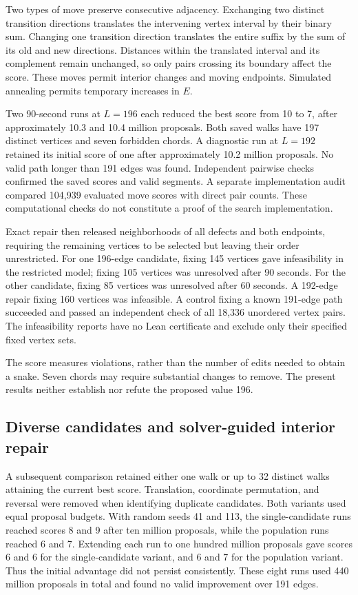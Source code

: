 \documentclass[11pt,a4paper]{article}
\theoremstyle{definition}
\theoremstyle{remark}
\begin{document}
Two types of move preserve consecutive adjacency. Exchanging two distinct transition directions translates the intervening vertex interval by their binary sum. Changing one transition direction translates the entire suffix by the sum of its old and new directions. Distances within the translated interval and its complement remain unchanged, so only pairs crossing its boundary affect the score. These moves permit interior changes and moving endpoints. Simulated annealing permits temporary increases in $E$.

Two 90-second runs at $L=196$ each reduced the best score from 10 to 7, after approximately 10.3 and 10.4 million proposals. Both saved walks have 197 distinct vertices and seven forbidden chords. A diagnostic run at $L=192$ retained its initial score of one after approximately 10.2 million proposals. No valid path longer than 191 edges was found. Independent pairwise checks confirmed the saved scores and valid segments. A separate implementation audit compared 104,939 evaluated move scores with direct pair counts. These computational checks do not constitute a proof of the search implementation.

Exact repair then released neighborhoods of all defects and both endpoints, requiring the remaining vertices to be selected but leaving their order unrestricted. For one 196-edge candidate, fixing 145 vertices gave infeasibility in the restricted model; fixing 105 vertices was unresolved after 90 seconds. For the other candidate, fixing 85 vertices was unresolved after 60 seconds. A 192-edge repair fixing 160 vertices was infeasible. A control fixing a known 191-edge path succeeded and passed an independent check of all 18,336 unordered vertex pairs. The infeasibility reports have no Lean certificate and exclude only their specified fixed vertex sets.

The score measures violations, rather than the number of edits needed to obtain a snake. Seven chords may require substantial changes to remove. The present results neither establish nor refute the proposed value 196.

\subsection{Diverse candidates and solver-guided interior repair}
A subsequent comparison retained either one walk or up to 32 distinct walks attaining the current best score. Translation, coordinate permutation, and reversal were removed when identifying duplicate candidates. Both variants used equal proposal budgets. With random seeds 41 and 113, the single-candidate runs reached scores 8 and 9 after ten million proposals, while the population runs reached 6 and 7. Extending each run to one hundred million proposals gave scores 6 and 6 for the single-candidate variant, and 6 and 7 for the population variant. Thus the initial advantage did not persist consistently. These eight runs used 440 million proposals in total and found no valid improvement over 191 edges.
\end{document}
